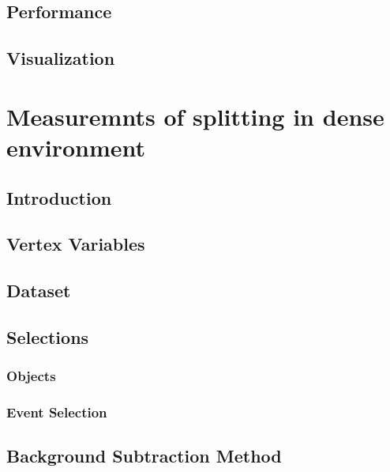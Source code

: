 \documentclass{report}
\begin{document}
\section{Performance}

\clearpage

\section{Visualization}

\clearpage

\chapter{Measuremnts of \gbb splitting in dense environment}
\label{chap:gbb}
\section{Introduction}

\clearpage

\section{Vertex Variables}
\label{sec:gbb-var}

\clearpage

\section{Dataset}

\clearpage

\section{Selections}
\label{sec:gbb-selection}
\subsection{Objects}

\subsection{Event Selection}

\clearpage

\section{Background Subtraction Method}

\clearpage
\end{document}

